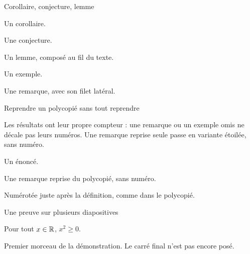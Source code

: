 \begin{slide}{Corollaire, conjecture, lemme}

\begin{corollary}
    Un corollaire.
\end{corollary}

\begin{conjecture}
    Une conjecture.
\end{conjecture}

\begin{lemma}
    Un lemme, composé au fil du texte.
\end{lemma}

\begin{example}
    Un exemple.
\end{example}

\begin{remark}
    Une remarque, avec son filet latéral.
\end{remark}

\end{slide}

\begin{slide}{Reprendre un polycopié sans tout reprendre}

Les résultats ont leur propre compteur : une remarque ou un exemple omis ne
décale pas leurs numéros. Une remarque reprise seule passe en variante
étoilée, sans numéro.

\begin{definition}[title={Ensemble négligeable}]
    Un énoncé.
\end{definition}

\begin{remark*}
    Une remarque reprise du polycopié, sans numéro.
\end{remark*}

\begin{proposition}
    Numérotée juste après la définition, comme dans le polycopié.
\end{proposition}

\end{slide}

\begin{slide}{Une preuve sur plusieurs diapositives}

\begin{proposition}
    Pour tout $x \in \mathbb{R}$, $x^2 \ge 0$.
\end{proposition}

\begin{proofbegin}
    Premier morceau de la démonstration. Le carré final n'est pas encore posé.
\end{proofbegin}

\end{slide}

